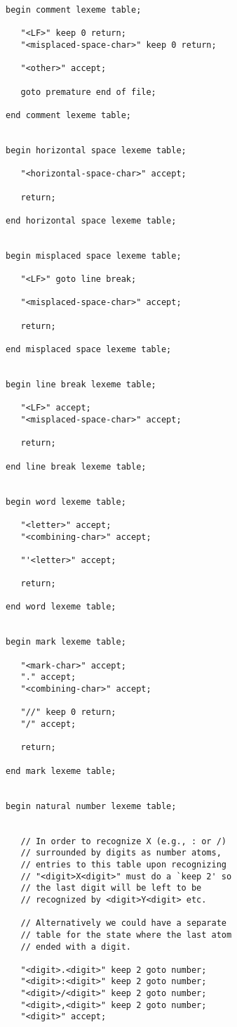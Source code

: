\documentclass[12pt]{article}
\newenvironment{indpar}[1][0.3in]%
	{\begin{list}{}%
		     {\setlength{\itemsep}{0in}%
		      \setlength{\topsep}{0in}%
		      \setlength{\parsep}{1ex}%
		      \setlength{\labelwidth}{#1}%
		      \setlength{\leftmargin}{#1}%
		      \addtolength{\leftmargin}{\labelsep}}%
	 \item}%
	{\end{list}}
\begin{document}
\begin{indpar}
\begin{verbatim}
begin comment lexeme table;

   "<LF>" keep 0 return;
   "<misplaced-space-char>" keep 0 return;

   "<other>" accept;

   goto premature end of file;

end comment lexeme table;


begin horizontal space lexeme table;

   "<horizontal-space-char>" accept;

   return;

end horizontal space lexeme table;


begin misplaced space lexeme table;

   "<LF>" goto line break;

   "<misplaced-space-char>" accept;

   return;

end misplaced space lexeme table;


begin line break lexeme table;

   "<LF>" accept;
   "<misplaced-space-char>" accept;

   return;

end line break lexeme table;


begin word lexeme table;

   "<letter>" accept;
   "<combining-char>" accept;

   "'<letter>" accept;

   return;

end word lexeme table;


begin mark lexeme table;

   "<mark-char>" accept;
   "." accept;
   "<combining-char>" accept;

   "//" keep 0 return;
   "/" accept;

   return;

end mark lexeme table;


begin natural number lexeme table;


   // In order to recognize X (e.g., : or /)
   // surrounded by digits as number atoms,
   // entries to this table upon recognizing
   // "<digit>X<digit>" must do a `keep 2' so
   // the last digit will be left to be
   // recognized by <digit>Y<digit> etc.

   // Alternatively we could have a separate
   // table for the state where the last atom
   // ended with a digit.

   "<digit>.<digit>" keep 2 goto number;
   "<digit>:<digit>" keep 2 goto number;
   "<digit>/<digit>" keep 2 goto number;
   "<digit>,<digit>" keep 2 goto number;
   "<digit>" accept;


\end{verbatim}
\end{indpar}
\end{document}
